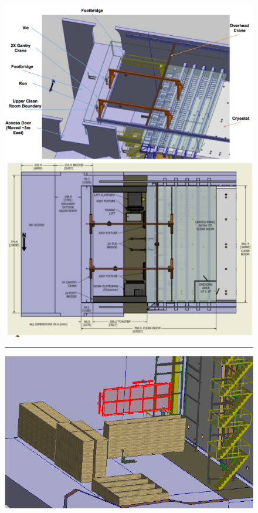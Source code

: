 \begin{figure}[!htb]
\begin{center}
\begin{minipage}[c]{0.49\textwidth}
\includegraphics[width=\textwidth]{far-detector-single-phase/figures/Install-ISO-Top.pdf}
\end{minipage}
\begin{minipage}[c]{0.49\textwidth}
\includegraphics[width=\textwidth]{far-detector-single-phase/figures/Install-TopView.pdf}
\end{minipage}
%
\vspace{5mm}
\hrule
\vspace{5mm}
%
\begin{minipage}[c]{0.32\textwidth}
\includegraphics[width=\textwidth]{far-detector-single-phase/figures/APA-1.pdf}

\end{minipage}
\end{center}
\end{figure}
